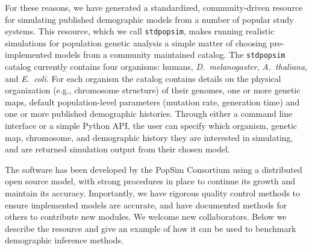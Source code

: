 \documentclass[12pt,halfline,a4paper]{ouparticle}
\newcommand{\stdpopsim}{\texttt{stdpopsim}\xspace}
\begin{document}

For these reasons, we have generated a standardized, community-driven resource
for simulating published demographic models from a number of popular study systems.
This resource, which we call \texttt{stdpopsim}, makes running
realistic simulations for population genetic analysis a simple matter of
choosing pre-implemented models from a community maintained catalog.
The \stdpopsim catalog currently contains four organisms: humans, 
\emph{D.~melanogaster}, \emph{A.~thaliana}, and \emph{E.~coli}. For each
organism the catalog contains details on the physical organization (e.g., chromosome structure)
of their genomes, one or more genetic maps, default population-level parameters (mutation rate,
generation time) and one or more published demographic histories. Through
either a command line interface or a simple Python API, the user can specify which
organism, genetic map, chromosome, and demographic history they are interested in simulating, and are returned
simulation output from their chosen model.

The software has been developed by the PopSim Consortium using a
distributed open source model, with strong procedures in place
to continue its growth and maintain its accuracy.
Importantly, we have rigorous quality control methods to ensure implemented models are accurate,
and have documented methods for others to contribute new modules.
We welcome new collaborators.
Below we describe the resource and give an
example of how it can be used to benchmark demographic inference methods.
\end{document}
